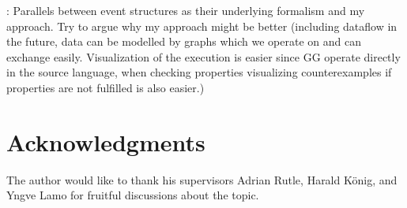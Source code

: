 \documentclass[a4paper]{easychair}
\begin{document}
\cite{kienzleUnifyingFrameworkHomogeneous2019}:
Parallels between event structures as their underlying formalism and my approach.
Try to argue why my approach might be better (including dataflow in the future, data can be modelled by graphs which we operate on and can exchange easily. Visualization of the execution is easier since GG operate directly in the source language, when checking properties visualizing counterexamples if properties are not fulfilled is also easier.)

\section{Acknowledgments} \label{sect:acks}
The author would like to thank his supervisors Adrian Rutle, Harald König, and Yngve Lamo for fruitful discussions about the topic.
\label{sect:bib}

%
%
%



\end{document}
